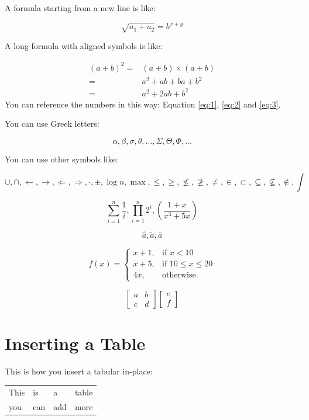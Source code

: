 \documentclass{article}[12pt]
\begin{document}
A formula starting from a new line is like:

$$\sqrt{a_1+a_2}=b^{x+y}$$

A long formula with aligned symbols is like:

\begin{align}
  (a+b)^2=& (a+b)\times(a+b) \label{eq:1}\\
  =& a^2+ab+ba+b^2 \label{eq:2}\\
  =&a^2+2ab+b^2 \label{eq:3}
\end{align}
You can reference the numbers in this way: Equation \ref{eq:1}, \ref{eq:2} and \ref{eq:3}.

You can use Greek letters:

$$\alpha, \beta, \sigma, \theta, \dots, \Sigma, \Theta, \Phi, \dots$$

You can use other symbols like:

$$\cup, \cap, \leftarrow, \rightarrow, \Leftarrow, \Rightarrow, \cdot, \pm, \log n, \max, \le, \ge, \nleq, \ngeq, \neq,\in,\subset,\subseteq,\nsubseteq,\notin,\int$$

$$\sum_{i=1}^{n}\frac{1}{i}, \prod_{i=1}^{n} 2^{i}, \left( \frac{1+x}{x^3+5x}\right)$$

$$\hat{a}, \tilde{a}, \bar{a}$$

$$f(x)=\begin{cases}
         x+1, & \mbox{if } x<10 \\
         x+5, & \mbox{if } 10\le x \le 20 \\
         4x, & \mbox{otherwise}.
       \end{cases}$$

$$\begin{bmatrix}
    a & b \\
    c & d
  \end{bmatrix}
\begin{bmatrix}
    e \\
    f
  \end{bmatrix}
$$

\section{Inserting a Table}

This is how you insert a tabular in-place:

\begin{tabular}{|l|l|l|l|}
  \hline
    This & is &a&table\\
    you  & can & add & more \\
  \hline
\end{tabular}
\end{document}

